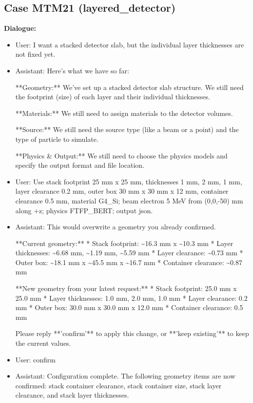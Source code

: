 \documentclass[11pt]{ctexart}
\begin{document}
\subsection{Case MTM21 (layered\_detector)}
\textbf{Dialogue:}
\begin{itemize}
\item User: I want a stacked detector slab, but the individual layer thicknesses are not fixed yet.
\item Assistant: Here's what we have so far:

**Geometry:** We've set up a stacked detector slab structure. We still need the footprint (size) of each layer and their individual thicknesses.

**Materials:** We still need to assign materials to the detector volumes.

**Source:** We still need the source type (like a beam or a point) and the type of particle to simulate.

**Physics \& Output:** We still need to choose the physics models and specify the output format and file location.
\item User: Use stack footprint 25 mm x 25 mm, thicknesses 1 mm, 2 mm, 1 mm, layer clearance 0.2 mm, outer box 30 mm x 30 mm x 12 mm, container clearance 0.5 mm, material G4\_Si; beam electron 5 MeV from (0,0,-50) mm along +z; physics FTFP\_BERT; output json.
\item Assistant: This would overwrite a geometry you already confirmed.

**Current geometry:**
*   Stack footprint: \textasciitilde{}16.3 mm x \textasciitilde{}10.3 mm
*   Layer thicknesses: \textasciitilde{}6.68 mm, \textasciitilde{}1.19 mm, \textasciitilde{}5.59 mm
*   Layer clearance: \textasciitilde{}0.73 mm
*   Outer box: \textasciitilde{}18.1 mm x \textasciitilde{}45.5 mm x \textasciitilde{}16.7 mm
*   Container clearance: \textasciitilde{}0.87 mm

**New geometry from your latest request:**
*   Stack footprint: 25.0 mm x 25.0 mm
*   Layer thicknesses: 1.0 mm, 2.0 mm, 1.0 mm
*   Layer clearance: 0.2 mm
*   Outer box: 30.0 mm x 30.0 mm x 12.0 mm
*   Container clearance: 0.5 mm

Please reply **'confirm'** to apply this change, or **'keep existing'** to keep the current values.
\item User: confirm
\item Assistant: Configuration complete. The following geometry items are now confirmed: stack container clearance, stack container size, stack layer clearance, and stack layer thicknesses.
\end{itemize}
\end{document}
